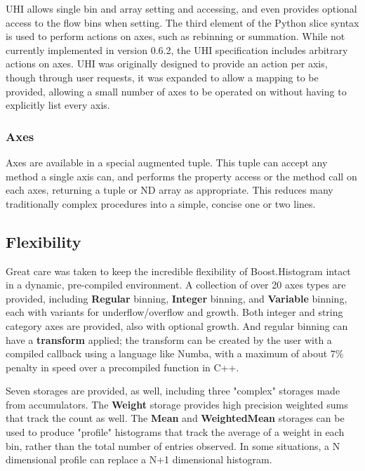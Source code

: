 \documentclass{webofc}
\begin{document}
UHI allows single bin and array setting and accessing, and even provides optional access to the flow bins when setting. The third element of the Python slice syntax is used to perform actions on axes, such as rebinning or summation. While not currently implemented in version 0.6.2, the UHI specification includes arbitrary actions on axes. UHI was originally designed to provide an action per axis, though through user requests, it was expanded to allow a mapping to be provided, allowing a small number of axes to be operated on without having to explicitly list every axis.

\subsubsection{Axes}
\label{sec-bhp-axes}

Axes are available in a special augmented tuple. This tuple can accept any method a single axis can, and performs the property access or the method call on each axes, returning a tuple or ND array as appropriate. This reduces many traditionally complex procedures into a simple, concise one or two lines.

\subsection{Flexibility}

Great care was taken to keep the incredible flexibility of Boost.Histogram intact in a dynamic, pre-compiled environment. A collection of over 20 axes types are provided, including \textbf{Regular} binning, \textbf{Integer} binning, and \textbf{Variable} binning, each with variants for underflow/overflow and growth. Both integer and string category axes are provided, also with optional growth. And regular binning can have a \textbf{transform} applied; the transform can be created by the user with a compiled callback using a language like Numba, with a maximum of about 7\% penalty in speed over a precompiled function in C++.

Seven storages are provided, as well, including three "complex" storages made from accumulators. The \textbf{Weight} storage provides high precision weighted sums that track the count as well. The \textbf{Mean} and \textbf{WeightedMean} storages can be used to produce "profile" histograms that track the average of a weight in each bin, rather than the total number of entries observed. In some situations, a N dimensional profile can replace a N+1 dimensional histogram.
\end{document}
